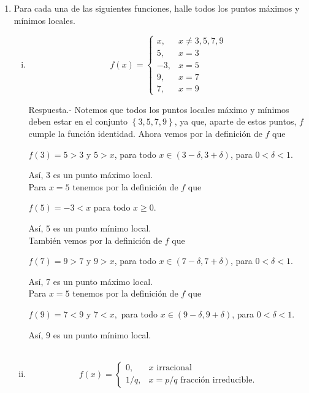 \begin{enumerate}[\bfseries 1.]
    \item Para cada una de las siguientes funciones, halle todos los puntos máximos y mínimos locales.
	\begin{enumerate}[(i)]

	    \item \;
	    $$f(x)=\left\{\begin{array}{rl}
		    x, & x\neq 3,5,7,9\\
		    5, & x=3\\
		    -3, & x=5\\
		    9, & x=7\\
		    7, & x=9
	    \end{array}\right.$$
	    \vspace{0.4cm}

		Respuesta.-\; Notemos que todos los puntos locales máximo y mínimos deben estar en el conjunto $\left\{3,5,7,9\right\}$, ya que, aparte de estos puntos, $f$ cumple la función identidad. Ahora vemos por la definición de $f$ que 
		\begin{center}
		    $f(3)=5>3$ y $5>x$, para todo $x\in (3-\delta,3+\delta)$, para $0<\delta<1.$
		\end{center}
		Así, $3$ es un punto máximo local.\\

		Para $x=5$ tenemos por la definición de $f$ que
		\begin{center}
		    $f(5)=-3<x$ para todo $x\geq 0.$
		\end{center}
		Así, $5$ es un punto mínimo local.\\

		También vemos por la definición de $f$ que
		\begin{center}
		    $f(7)=9>7$ y $9>x$, para todo $x\in (7-\delta,7+\delta)$, para $0<\delta<1.$
		\end{center}
		Así, $7$ es un punto máximo local.\\

		Para $x=5$ tenemos por la definición de $f$ que
		\begin{center}
		    $f(9)=7<9$ y $7<x,$ para todo $x\in (9-\delta,9+\delta)$, para $0<\delta<1.$
		\end{center}
		Así, $9$ es un punto mínimo local.\\\\

	    \item \;
	    $$f(x)=\left\{\begin{array}{rl}
		    0, & x \mbox{ irracional}\\
		    1/q, & x=p/q \mbox{ fracción irreducible}.
	    \end{array}\right.$$
	    \vspace{0.4cm}


\end{enumerate}
\end{enumerate}
